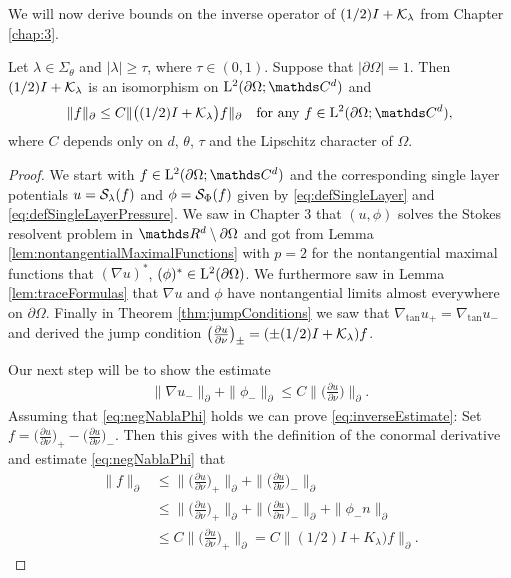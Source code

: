 We will now derive bounds on the inverse operator of $(1/2) I + \mathcal{K}_\lambda$ from Chapter \ref{chap:3}. 

\begin{lem}
  Let $\lambda \in \Sigma_\theta$ and $|\lambda| \geq \tau$, where $\tau \in (0,1)$.
  Suppose that $|\partial\Omega| = 1$.
  Then $(1/2)I + \mathcal{K}_\lambda$ is an isomorphism on $\Ell^2(\partial\Omega; \C^d)$ and
  \begin{align}
    \label{eq:inverseEstimate}
    \| f\|_\partial \leq C \|\big( (1/2) I + \K_\lambda \big) f \|_\partial \quad\text{for any } f \in \Ell^2(\partial\Omega; \C^d),
  \end{align}
  where $C$ depends only on $d$, $\theta$, $\tau$ and the Lipschitz character of $\Omega$.
\end{lem}

\begin{proof}
  We start with $f \in \Ell^2(\partial\Omega; \C^d)$ and the corresponding single layer potentials $u = \mathcal{S}_\lambda(f)$ and $\phi = \mathcal{S}_\Phi(f)$ given by \eqref{eq:defSingleLayer} and \eqref{eq:defSingleLayerPressure}.
  We saw in Chapter 3 that $(u,\phi)$ solves the Stokes resolvent problem in $\R^d \setminus \partial\Omega$ and got from Lemma \ref{lem:nontangentialMaximalFunctions} with $p = 2$ for the nontangential maximal functions that $(\nabla u)^*$, $(\phi)^* \in \mathrm{L}^2(\partial\Omega)$.
  We furthermore saw in Lemma \ref{lem:traceFormulas} that $\nabla u$ and $\phi$ have nontangential limits almost everywhere on $\partial\Omega$. 
  Finally in Theorem \ref{thm:jumpConditions} we saw that $\nabla_{\mathrm{tan}} u_+ = \nabla_{\mathrm{tan}} u_-$ and derived the jump condition $\big(\frac{\partial u}{\partial \nu}\big)_\pm = (\pm (1/2) I + \mathcal{K}_\lambda) f$.

  Our next step will be to show the estimate
  \begin{align}
    \label{eq:negNablaPhi}
    \| \nabla u_- \|_\partial + \| \phi_- \|_\partial \leq C \| \big( \frac{\partial u}{\partial \nu} \big) \|_\partial .
  \end{align}
  Assuming that \eqref{eq:negNablaPhi} holds we can prove \eqref{eq:inverseEstimate}:
  Set $f = \big(\frac{\partial u}{\partial \nu} \big)_+ -  \big( \frac{\partial u}{\partial \nu} \big)_-$.
  Then this gives with the definition of the conormal derivative and estimate \eqref{eq:negNablaPhi} that
  \begin{align*}
    \| f\|_\partial 
    &\leq  \| \big( \frac{\partial u}{\partial \nu} \big)_+ \|_\partial + \| \big( \frac{\partial u}{\partial \nu} \big)_- \|_\partial  \\
    &\leq \| \big( \frac{\partial u}{\partial \nu} \big)_+  \|_\partial + \| \big( \frac{\partial u}{\partial n} \big)_- \|_\partial + \| \phi_- n \|_\partial  \\
    &\leq C \| \big( \frac{\partial u}{\partial \nu} \big)_+ \|_\partial
    = C \| (1/2)I + K_\lambda) f\|_\partial.
  \end{align*}


\end{proof}
